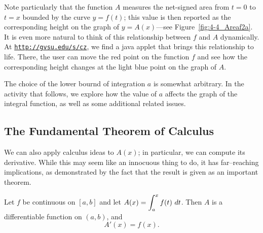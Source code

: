 Note particularly that the function $A$ measures the net-signed area from $t = 0$ to $t = x$ bounded by the curve $y = f(t)$; this value is then reported as the corresponding height on the graph of $y = A(x)$---see Figure~\ref{fig:4-4_Areaf2a}.  It is even more natural to think of this relationship between $f$ and $A$ dynamically.  At \href{http://gvsu.edu/s/cz}{\texttt{http://gvsu.edu/s/cz}}, we find a java applet that brings this relationship to life.  There, the user can move the red point on the function $f$ and see how the corresponding height changes at the light blue point on the graph of $A$.


The choice of the lower bournd of integration $a$ is somewhat arbitrary.  In the activity that follows, we explore how the value of $a$ affects the graph of the integral function, as well as some additional related issues.


\subsection*{The Fundamental Theorem of Calculus} 

We can also apply calculus ideas to $A(x)$; in particular, we can compute its derivative. While this may seem like an innocuous thing to do, it has far--reaching implications, as demonstrated by the fact that the result is given as an important theorem.

{Let $f$ be continuous on $[a,b]$ and let $\displaystyle A(x) = \int_a^x f(t)\ dt$. Then $A$ is a differentiable function on $(a,b)$, and
\[ A'(x)=f(x). \]
} %


